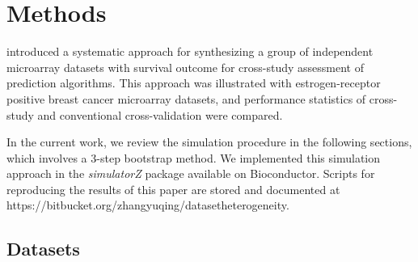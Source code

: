 \documentclass{bioinfo}
\begin{document}
\section{Methods}


  \citet{Bernau2014} introduced a systematic approach for synthesizing a
  group of independent microarray datasets with survival outcome for
  cross-study assessment of prediction algorithms. %
  This approach was illustrated with estrogen-receptor 
  positive breast cancer microarray datasets, and performance statistics of cross-study 
  and conventional cross-validation were compared.
  
  In the current work, we review the simulation procedure in the following sections, 
  which involves a 3-step bootstrap method. We implemented this simulation approach 
  in the \emph{simulatorZ} package available on Bioconductor. Scripts for reproducing
  the results of this paper are stored and documented at
  \\ https://bitbucket.org/zhangyuqing/datasetheterogeneity. 
  
  \subsection{Datasets}
\end{document}

